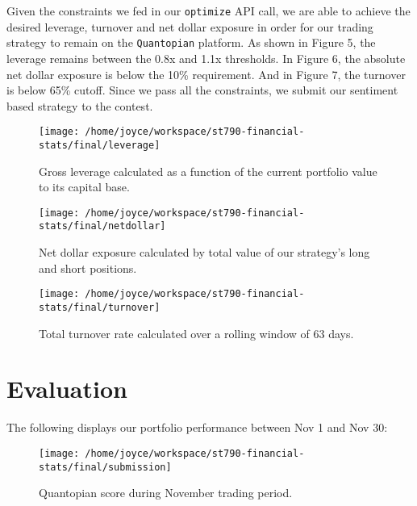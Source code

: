 \documentclass[11pt,]{article}
\begin{document}
Given the constraints we fed in our \texttt{optimize} API call, we are
able to achieve the desired leverage, turnover and net dollar exposure
in order for our trading strategy to remain on the \texttt{Quantopian}
platform. As shown in Figure 5, the leverage remains between the 0.8x
and 1.1x thresholds. In Figure 6, the absolute net dollar exposure is
below the 10\% requirement. And in Figure 7, the turnover is below 65\%
cutoff. Since we pass all the constraints, we submit our sentiment based
strategy to the contest.

\begin{figure}

{\centering \texttt{[image: /home/joyce/workspace/st790-financial-stats/final/leverage]} 

}

\caption{Gross leverage calculated as a function of the current portfolio value to its capital base.}\label{fig:unnamed-chunk-6}
\end{figure}

\begin{figure}

{\centering \texttt{[image: /home/joyce/workspace/st790-financial-stats/final/netdollar]} 

}

\caption{Net dollar exposure calculated by total value of our strategy's long and short positions.}\label{fig:unnamed-chunk-7}
\end{figure}

\begin{figure}

{\centering \texttt{[image: /home/joyce/workspace/st790-financial-stats/final/turnover]} 

}

\caption{Total turnover rate calculated over a rolling window of 63 days.}\label{fig:unnamed-chunk-8}
\end{figure}

\section{Evaluation}\label{evaluation}

The following displays our portfolio performance between Nov 1 and Nov
30:

\begin{figure}

{\centering \texttt{[image: /home/joyce/workspace/st790-financial-stats/final/submission]} 

}

\caption{Quantopian score during November trading period.}\label{fig:unnamed-chunk-9}
\end{figure}
\end{document}
